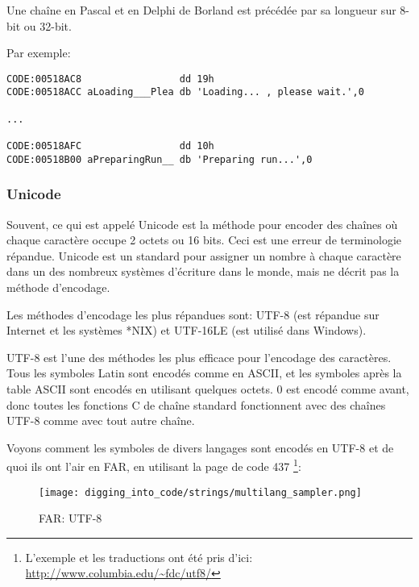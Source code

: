 Une chaîne en Pascal et en Delphi de Borland est précédée par sa longueur sur 8-bit
ou 32-bit.

Par exemple:

\begin{lstlisting}[caption=Delphi,style=customasmx86]
CODE:00518AC8                 dd 19h
CODE:00518ACC aLoading___Plea db 'Loading... , please wait.',0

...

CODE:00518AFC                 dd 10h
CODE:00518B00 aPreparingRun__ db 'Preparing run...',0
\end{lstlisting}

\subsubsection{Unicode}


Souvent, ce qui est appelé Unicode est la méthode pour encoder des chaînes où chaque
caractère occupe 2 octets ou 16 bits.
Ceci est une erreur de terminologie répandue.
Unicode est un standard pour assigner un nombre à chaque caractère dans un des nombreux
systèmes d'écriture dans le monde, mais ne décrit pas la méthode d'encodage.

Les méthodes d'encodage les plus répandues sont: UTF-8 (est répandue sur Internet
et les systèmes *NIX) et UTF-16LE (est utilisé dans Windows).


UTF-8 est l'une des méthodes les plus efficace pour l'encodage des caractères.
Tous les symboles Latin sont encodés comme en ASCII, et les symboles après la table
ASCII sont encodés en utilisant quelques octets.
0 est encodé comme avant, donc toutes les fonctions C de chaîne standard fonctionnent
avec des chaînes UTF-8 comme avec tout autre chaîne.

Voyons comment les symboles de divers langages sont encodés en UTF-8 et de quoi ils
ont l'air en FAR, en utilisant la page de code 437%
\footnote{L'exemple et les traductions ont été pris d'ici:
\url{http://www.columbia.edu/~fdc/utf8/}}:

\begin{figure}[H]
\centering
\texttt{[image: digging\_into\_code/strings/multilang\_sampler.png]}
\end{figure}

\begin{figure}[H]
\centering
{}
\caption{FAR: UTF-8}
\end{figure}

